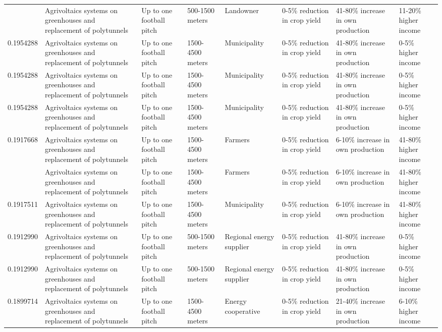 \begin{table}
\begin{tabular}[t]{rlllllll}
\addlinespace
0.1955652 & Agrivoltaics systems on greenhouses
and replacement of polytunnels & Up to one football pitch & 500-1500 meters & Landowner & 0-5\% reduction in crop yield & 41-80\% increase in own production & 11-20\% higher income\\
0.1954288 & Agrivoltaics systems on greenhouses
and replacement of polytunnels & Up to one football pitch & 1500-4500 meters & Municipality & 0-5\% reduction in crop yield & 41-80\% increase in own production & 0-5\% higher income\\
0.1954288 & Agrivoltaics systems on greenhouses
and replacement of polytunnels & Up to one football pitch & 1500-4500 meters & Municipality & 0-5\% reduction in crop yield & 41-80\% increase in own production & 0-5\% higher income\\
0.1954288 & Agrivoltaics systems on greenhouses
and replacement of polytunnels & Up to one football pitch & 1500-4500 meters & Municipality & 0-5\% reduction in crop yield & 41-80\% increase in own production & 0-5\% higher income\\
0.1917668 & Agrivoltaics systems on greenhouses
and replacement of polytunnels & Up to one football pitch & 1500-4500 meters & Farmers & 0-5\% reduction in crop yield & 6-10\% increase in own production & 41-80\% higher income\\
\addlinespace
0.1917668 & Agrivoltaics systems on greenhouses
and replacement of polytunnels & Up to one football pitch & 1500-4500 meters & Farmers & 0-5\% reduction in crop yield & 6-10\% increase in own production & 41-80\% higher income\\
0.1917511 & Agrivoltaics systems on greenhouses
and replacement of polytunnels & Up to one football pitch & 1500-4500 meters & Municipality & 0-5\% reduction in crop yield & 6-10\% increase in own production & 41-80\% higher income\\
0.1912990 & Agrivoltaics systems on greenhouses
and replacement of polytunnels & Up to one football pitch & 500-1500 meters & Regional energy supplier & 0-5\% reduction in crop yield & 41-80\% increase in own production & 0-5\% higher income\\
0.1912990 & Agrivoltaics systems on greenhouses
and replacement of polytunnels & Up to one football pitch & 500-1500 meters & Regional energy supplier & 0-5\% reduction in crop yield & 41-80\% increase in own production & 0-5\% higher income\\
0.1899714 & Agrivoltaics systems on greenhouses
and replacement of polytunnels & Up to one football pitch & 1500-4500 meters & Energy cooperative & 0-5\% reduction in crop yield & 21-40\% increase in own production & 6-10\% higher income\\

\end{tabular}
\end{table}
